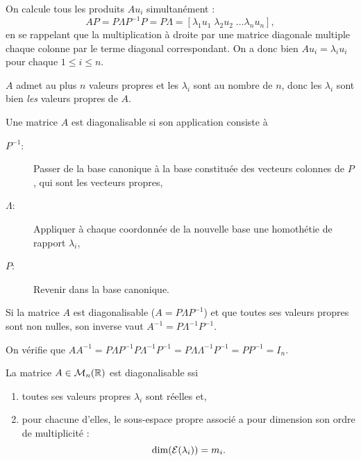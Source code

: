 \proof
  On calcule tous les produits $A u_i$ simultanément : 
  $$
  A P 
  = P \Lambda P^{-1} P 
  = P \Lambda
  = [\lambda_1 u_1 \; \lambda_2 u_2 \; \dots \lambda_n u_n],
  $$
  en se rappelant que la multiplication à droite par une matrice diagonale multiple chaque colonne par le terme diagonal correspondant. On a donc bien $A u_i = \lambda_i u_i$ pour chaque $1 \leq i \leq n$. \\
\eproof

\remark
$A$ admet au plus $n$ valeurs propres et les $\lambda_i$ sont au nombre de $n$, donc les $\lambda_i$ sont bien {\em les} valeurs propres de $A$.

\remark
Une matrice $A$ est diagonalisable si son application consiste à
\begin{description}
 \item[$P^{-1}$:] Passer de la base canonique à la base constituée des vecteurs colonnes de $P$, qui sont les vecteurs propres,
 \item[$\Lambda$:] Appliquer à chaque coordonnée de la nouvelle base une homothétie de rapport $\lambda_i$,
 \item[$P$:] Revenir dans la base canonique.
\end{description}



\begin{proposition}
  Si la matrice $A$ est diagonalisable ($A = P \Lambda P^{-1}$) et que toutes ses valeurs propres sont non nulles, son inverse vaut $A^{-1} = P \Lambda^{-1} P^{-1}$.
\end{proposition}

\proof
On vérifie que $A A^{-1} = P \Lambda P^{-1} P \Lambda^{-1} P^{-1} = P \Lambda \Lambda^{-1} P^{-1} = P P^{-1} = I_n$.
\eproof

\begin{theorem}
  La matrice $A \in \mathcal{M}_n(\mathbb{R})$ est diagonalisable ssi 
  \begin{enumerate}
   \item toutes ses valeurs propres $\lambda_i$ sont réelles et, 
   \item pour chacune d'elles, le sous-espace propre associé a pour dimension son ordre de multiplicité : 
   $$
   \dim(\mathcal{E}(\lambda_i)) = m_i.
   $$
  \end{enumerate}
\end{theorem}

